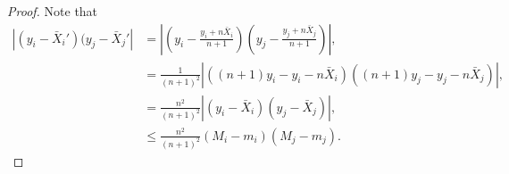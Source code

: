 \documentclass[11pt]{scrartcl} %
\begin{document}
\begin{proof}
Note that
\begin{align*}
 \left\vert (y_i - \bar{X}_i')(y_j - \bar{X}_j' \right\vert &= \left\vert \left( y_i - \frac{y_i + n \bar{X}_i}{n+1}\right) \left( y_j - \frac{y_j + n \bar{X}_j}{n+1}\right) \right\vert, \\
 	&= \frac{1}{(n+1)^2} \left\vert \left((n+1)y_i - y_i - n\bar{X}_i \right)\left((n+1)y_j - y_j - n\bar{X}_j \right) \right\vert, \\
	&= \frac{n^2}{(n+1)^2} \left\vert (y_i - \bar{X}_i)(y_j - \bar{X}_j)\right\vert, \\
	&\le \frac{n^2}{(n+1)^2} (M_i - m_i)(M_j - m_j).
\end{align*}
\end{proof}
%
\end{document}
